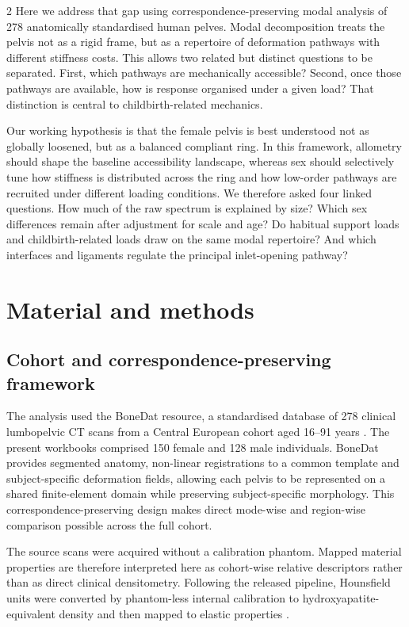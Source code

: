 \documentclass[openacc]{rsproca_new}
\begin{document}
\begin{multicols}{2}
Here we address that gap using correspondence-preserving modal analysis of 278 anatomically standardised human pelves. Modal decomposition treats the pelvis not as a rigid frame, but as a repertoire of deformation pathways with different stiffness costs. This allows two related but distinct questions to be separated. First, which pathways are mechanically accessible? Second, once those pathways are available, how is response organised under a given load? That distinction is central to childbirth-related mechanics.

Our working hypothesis is that the female pelvis is best understood not as globally loosened, but as a balanced compliant ring. In this framework, allometry should shape the baseline accessibility landscape, whereas sex should selectively tune how stiffness is distributed across the ring and how low-order pathways are recruited under different loading conditions. We therefore asked four linked questions. How much of the raw spectrum is explained by size? Which sex differences remain after adjustment for scale and age? Do habitual support loads and childbirth-related loads draw on the same modal repertoire? And which interfaces and ligaments regulate the principal inlet-opening pathway?

\section{Material and methods}

\subsection{Cohort and correspondence-preserving framework}

The analysis used the BoneDat resource, a standardised database of 278 clinical lumbopelvic CT scans from a Central European cohort aged 16--91 years \cite{henys2025}. The present workbooks comprised 150 female and 128 male individuals. BoneDat provides segmented anatomy, non-linear registrations to a common template and subject-specific deformation fields, allowing each pelvis to be represented on a shared finite-element domain while preserving subject-specific morphology. This correspondence-preserving design makes direct mode-wise and region-wise comparison possible across the full cohort.

The source scans were acquired without a calibration phantom. Mapped material properties are therefore interpreted here as cohort-wise relative descriptors rather than as direct clinical densitometry. Following the released pipeline, Hounsfield units were converted by phantom-less internal calibration to hydroxyapatite-equivalent density and then mapped to elastic properties \cite{henys2025}.


\end{multicols}
\end{document}
